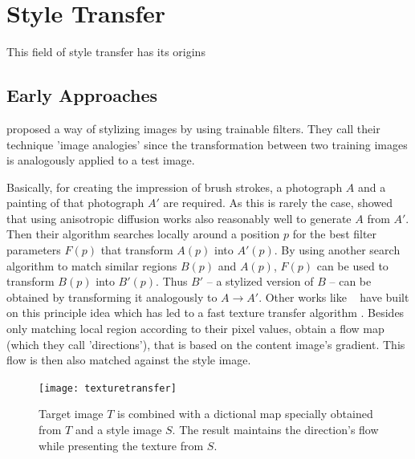 \section{Style Transfer}

This field of style transfer has its origins 

\subsection{Early Approaches}

\citeauthor*{imageanalogies} proposed a way of stylizing images by using trainable filters.
They call their technique 'image analogies' since the transformation between two training images is analogously applied to a test image.

Basically, for creating the impression of brush strokes, a photograph $A$ and a painting of that photograph $A'$ are required.
As this is rarely the case, \citeauthor*{iamgeanalogies} showed that using anisotropic diffusion works also reasonably well to generate $A$ from $A'$.
Then their algorithm searches locally around a position $p$ for the best filter parameters $F(p)$ that transform $A(p)$ into $A'(p)$.
By using another search algorithm to match similar regions $B(p)$ and $A(p)$, $F(p)$ can be used to transform $B(p)$ into $B'(p)$.
Thus $B'$ -- a stylized version of $B$ -- can be obtained by transforming it analogously to $A \rightarrow A'$.
Other works like \citeauthor*{texturetransfer}~\cite{texturetransfer} have built on this principle idea which has led to a fast texture transfer algorithm \cite{fasttexturetransfer}.
Besides only matching local region according to their pixel values, \citeauthor*{texturetransfer} obtain a flow map (which they call 'directions'), that is based on the content image's gradient.
This flow is then also matched against the style image.
\begin{figure}
    \texttt{[image: texturetransfer]}
    \caption[]{Target image $T$ is combined with a dictional map specially obtained from $T$ and a style image  $S$. The result maintains the direction's flow while presenting the texture from $S$.}
\end{figure}

